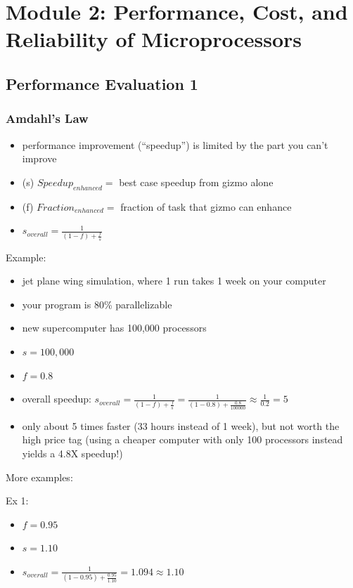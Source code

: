 \documentclass[12pt]{extarticle}
\begin{document}
	\section{Module 2: Performance, Cost, and Reliability of Microprocessors}

	\subsection{Performance Evaluation 1}

	\subsubsection{Amdahl's Law}

	\begin{itemize}
		\item performance improvement (``speedup'') is limited by the part you can't improve
		\item (s) $Speedup_{enhanced} =$ best case speedup from gizmo alone
		\item (f) $Fraction_{enhanced} =$ fraction of task that gizmo can enhance
		\item $s_{overall} = \frac{1}{(1 - f) + \frac{f}{s}}$
	\end{itemize}

	Example:

	\begin{itemize}
		\item jet plane wing simulation, where 1 run takes 1 week on your computer
		\item your program is 80\% parallelizable
		\item new supercomputer has 100,000 processors
		\item $s = 100,000$
		\item $f = 0.8$
		\item overall speedup: $s_{overall} = \frac{1}{(1 - f) + \frac{f}{s}} = \frac{1}{(1 - 0.8) + \frac{0.8}{100000}} \approx \frac{1}{0.2} = 5$
		\item only about 5 times faster (33 hours instead of 1 week), but not worth the high price tag (using a cheaper computer with only 100 processors instead yields a 4.8X speedup!)
	\end{itemize}

	More examples:

	Ex 1:

	\begin{itemize}
		\item $f = 0.95$
		\item $s = 1.10$
		\item $s_{overall} = \frac{1}{(1-0.95) + \frac{0.95}{1.10}} = 1.094 \approx 1.10$
	\end{itemize}
\end{document}

